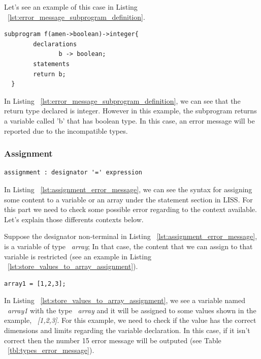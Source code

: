 \documentclass[
  oneside,
  11pt, a4paper,
  footinclude=true,
  headinclude=true,
  cleardoublepage=empty
]{scrbook}
\begin{document}
Let's see an example of this case in Listing ~\ref{lst:error_message_subprogram_definition}.

\begin{lstlisting}[label={lst:error_message_subprogram_definition},caption={Example of error message in LISS for subprogram\_definition non\_terminal}]
  subprogram f(amen->boolean)->integer{
        declarations
               b -> boolean;
        statements
        return b;
  }
\end{lstlisting}

In Listing ~\ref{lst:error_message_subprogram_definition}, we can see that the return type declared is integer. However in this example, the subprogram returns a variable called 'b' that has boolean type. In this case, an error message will be reported due to the incompatible types.

\subsubsection{Assignment}

\begin{lstlisting}[label={lst:assignment_error_message},caption={Assignment rule in LISS}]
  assignment : designator '=' expression
\end{lstlisting}

In Listing ~\ref{lst:assignment_error_message}, we can see the syntax for assigning some content to a variable or an array under the statement section in LISS.
For this part we need to check some possible error regarding to the context available.
Let's explain those differents contexts below.

Suppose the designator non-terminal in Listing ~\ref{lst:assignment_error_message}, is a variable of type ~\textit{array}; In that case, the content that we can assign to that variable is restricted (see an example in Listing ~\ref{lst:store_values_to_array_assignment}).

\begin{lstlisting}[caption={Example of assigning a constant value to an array variable},label={lst:store_values_to_array_assignment}]
  array1 = [1,2,3];
\end{lstlisting}

In Listing ~\ref{lst:store_values_to_array_assignment}, we see a variable named ~\textit{array1} with the type ~\textit{array} and it will be assigned to some values shown in the example, ~\textit{[1,2,3]}. For this example, we need to check if the value has the correct dimensions and limits regarding the variable declaration. In this case, if it isn't correct then the number 15 error message will be outputed (see Table ~\ref{tbl:types_error_message}).
\end{document}
